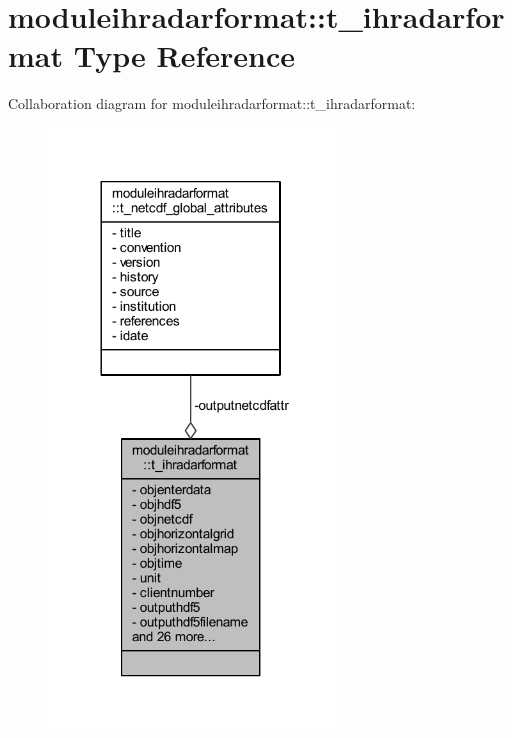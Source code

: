 \hypertarget{structmoduleihradarformat_1_1t__ihradarformat}{}\section{moduleihradarformat\+:\+:t\+\_\+ihradarformat Type Reference}
\label{structmoduleihradarformat_1_1t__ihradarformat}


Collaboration diagram for moduleihradarformat\+:\+:t\+\_\+ihradarformat\+:\nopagebreak
\begin{figure}[H]
\begin{center}
\leavevmode
\includegraphics[width=221pt]{structmoduleihradarformat_1_1t__ihradarformat__coll__graph}
\end{center}
\end{figure}
